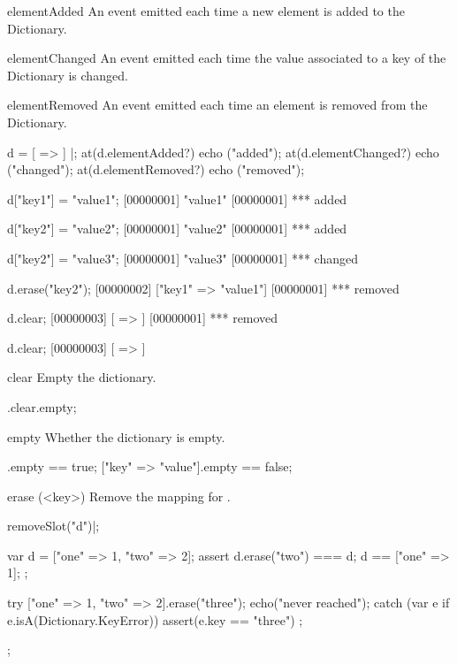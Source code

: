 \begin{urbiscriptapi}
\item[elementAdded] An event emitted each time a new element is added to
  the Dictionary.

\item[elementChanged] An event emitted each time the value associated to a
  key of the Dictionary is changed.

\item[elementRemoved] An event emitted each time an element is removed from
  the Dictionary.

\begin{urbiscript}
d = [ => ] |;
at(d.elementAdded?) echo ("added");
at(d.elementChanged?) echo ("changed");
at(d.elementRemoved?) echo ("removed");

d["key1"] = "value1";
[00000001] "value1"
[00000001] *** added

d["key2"] = "value2";
[00000001] "value2"
[00000001] *** added

d["key2"] = "value3";
[00000001] "value3"
[00000001] *** changed

d.erase("key2");
[00000002] ["key1" => "value1"]
[00000001] *** removed

d.clear;
[00000003] [ => ]
[00000001] *** removed

d.clear;
[00000003] [ => ]
\end{urbiscript}

\item[clear]
  Empty the dictionary.

\begin{urbiassert}
["one" => 1].clear.empty;
\end{urbiassert}


\item[empty]
  Whether the dictionary is empty.

\begin{urbiassert}
[=>].empty == true;
["key" => "value"].empty == false;
\end{urbiassert}


\item[erase](<key>) Remove the mapping for .
\begin{urbicomment}
removeSlot("d")|;
\end{urbicomment}
\begin{urbiscript}
{
  var d = ["one" => 1, "two" => 2];
  assert
  {
    d.erase("two") === d;
    d == ["one" => 1];
  };

  try
  {
    ["one" => 1, "two" => 2].erase("three");
    echo("never reached");
  }
  catch (var e if e.isA(Dictionary.KeyError))
  {
    assert(e.key == "three")
  };
};
\end{urbiscript}


\end{urbiscriptapi}

